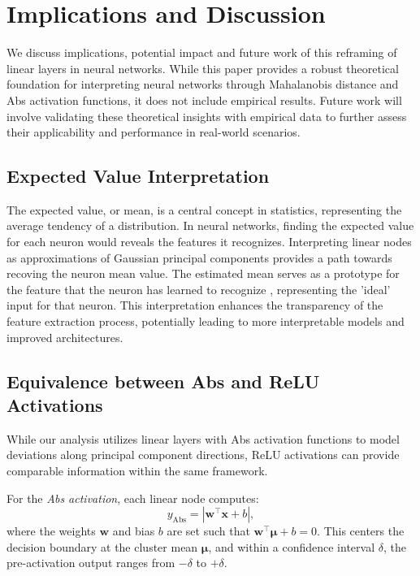 
\section{Implications and Discussion}
\label{sec:discussion}

We discuss implications, potential impact and future work of this reframing of linear layers in neural networks. While this paper provides a robust theoretical foundation for interpreting neural networks through Mahalanobis distance and Abs activation functions, it does not include empirical results. Future work will involve validating these theoretical insights with empirical data to further assess their applicability and performance in real-world scenarios.

\subsection{Expected Value Interpretation}

The expected value, or mean, is a central concept in statistics, representing the average tendency of a distribution. In neural networks, finding the expected value for each neuron would reveals the features it recognizes. Interpreting linear nodes as approximations of Gaussian principal components  provides a path towards recoving the neuron mean value. The estimated mean serves as a prototype for the feature that the neuron has learned to recognize \citep{li2018deep}, representing the 'ideal' input for that neuron. This interpretation enhances the transparency of the feature extraction process, potentially leading to more interpretable models and improved architectures.

\subsection{Equivalence between Abs and ReLU Activations}

While our analysis utilizes linear layers with Abs activation functions to model deviations along principal component directions, ReLU activations can provide comparable information within the same framework.

For the \emph{Abs activation}, each linear node computes:
\begin{equation}
\label{eq:abs_activation_compact}
y_{\text{Abs}} = \left| \mathbf{w}^\top \mathbf{x} + b \right|,
\end{equation}
where the weights \(\mathbf{w}\) and bias \(b\) are set such that \(\mathbf{w}^\top \boldsymbol{\mu} + b = 0\). This centers the decision boundary at the cluster mean \(\boldsymbol{\mu}\), and within a confidence interval \(\delta\), the pre-activation output ranges from \(-\delta\) to \(+\delta\).

